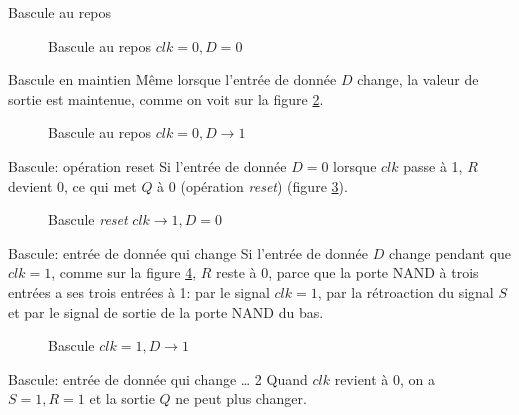 \documentclass[presentation]{beamer}
\begin{document}
\begin{frame}[label={sec:org5fca846}]{Bascule au repos}
\begin{figure}[htbp]
\centering

\caption{\label{fig:orgf865d45}Bascule au repos  \(clk = 0, D=0\)}
\end{figure}
\end{frame}

\begin{frame}[label={sec:orgf6cb5d6}]{Bascule en maintien}
Même lorsque l'entrée de donnée \(D\) change, la valeur de sortie est
maintenue, comme on voit sur la figure \ref{fig:org2f0ad9f}.

\begin{figure}[htbp]
\centering

\caption{\label{fig:org2f0ad9f}Bascule au repos  \(clk = 0, D \rightarrow 1\)}
\end{figure}
\end{frame}

\begin{frame}[label={sec:org8383b0b}]{Bascule: opération reset}
Si l'entrée de donnée \(D = 0\) lorsque \(clk\) passe à 1, \(R\)
devient 0, ce qui met \(Q\) à 0 (opération \emph{reset}) (figure
\ref{fig:org077214a}).

\begin{figure}[htbp]
\centering

\caption{\label{fig:org077214a}Bascule  \emph{reset} \(clk \rightarrow 1, D=0\)}
\end{figure}
\end{frame}

\begin{frame}[label={sec:orgc34aab0}]{Bascule: entrée de donnée qui change}
Si l'entrée de donnée \(D\) change pendant que \(clk = 1\), comme sur
la figure \ref{fig:org1f6a636}, \(R\) reste à 0, parce que la porte NAND à
trois entrées a ses trois entrées à 1: par le signal \(clk = 1\), par
la rétroaction du signal \(S\) et par le signal de sortie de la porte
NAND du bas.

\begin{figure}[htbp]
\centering

\caption{\label{fig:org1f6a636}Bascule   \(clk = 1, D \rightarrow 1\)}
\end{figure}
\end{frame}

\begin{frame}[label={sec:org32ce488}]{Bascule: entrée de donnée qui change \ldots{} 2}
Quand \(clk\) revient à 0, on a \(S= 1, R=1\) et la sortie \(Q\) ne
peut plus changer.
\end{frame}
\end{document}
